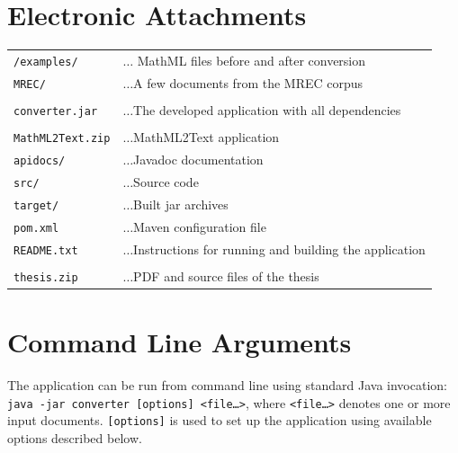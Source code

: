 \documentclass[11pt,oneside,final]{fithesis2}
\begin{document}
\chapter{Electronic Attachments}
\noindent
\begin{tabular}[p]{@{}p{} p{}}
\texttt{/examples/} & $\ldots$ MathML files before and after conversion
\tabularnewline
\qquad\texttt{MREC/} & $\ldots$A few documents from the MREC corpus
\tabularnewline
\tabularnewline
\texttt{converter.jar} & $\ldots$The developed application with all dependencies 
\tabularnewline
\tabularnewline
\texttt{MathML2Text.zip} & $\ldots$MathML2Text application
\tabularnewline
\qquad\texttt{apidocs/} & $\ldots$Javadoc documentation
\tabularnewline
\qquad\texttt{src/} & $\ldots$Source code
\tabularnewline
\qquad\texttt{target/} & $\ldots$Built jar archives
\tabularnewline
\qquad\texttt{pom.xml} & $\ldots$Maven configuration file
\tabularnewline
\qquad\texttt{README.txt} & $\ldots$Instructions for running and building the application
\tabularnewline
\tabularnewline
\texttt{thesis.zip} & $\ldots$PDF and source files of the thesis
\end{tabular}

\chapter{Command Line Arguments}
\label{appendix:commandlinearguments}
The application can be run from command line using standard Java invocation: \texttt{java -jar converter [options] <file\ldots>}, where \texttt{<file\ldots>} denotes one or more input documents. \texttt{[options]} is used to set up the application using available options described below.\\

\end{document}
